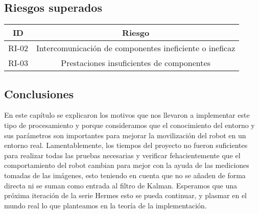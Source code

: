 \subsection{Riesgos superados}
\begin{center}
    \begin{tabular} {
        | c| c |}
        \hline \rowcolor{test_header_color}
            ID & Riesgo \\
        \hline
            RI-02 & Intercomunicación de componentes ineficiente o ineficaz \\
        \hline
            RI-03 & Prestaciones insuficientes de componentes \\
        \hline
    \end{tabular}
\end{center}

\subsection{Conclusiones}
En este capítulo se explicaron los motivos que nos llevaron a implementar este tipo de procesamiento y porque consideramos que el conocimiento del entorno y sus parámetros son importantes para mejorar la movilización del robot en un entorno real. Lamentablemente, los tiempos del proyecto no fueron suficientes para realizar todas las pruebas necesarias y verificar fehacientemente que el comportamiento del robot cambian para mejor con la ayuda de las mediciones tomadas de las imágenes, esto teniendo en cuenta que no se añaden de forma directa ni se suman como entrada al filtro de Kalman.
Esperamos que una próxima iteración de la serie Hermes esto se pueda continuar, y plasmar en el mundo real lo que planteamos en la teoría de la implementación.